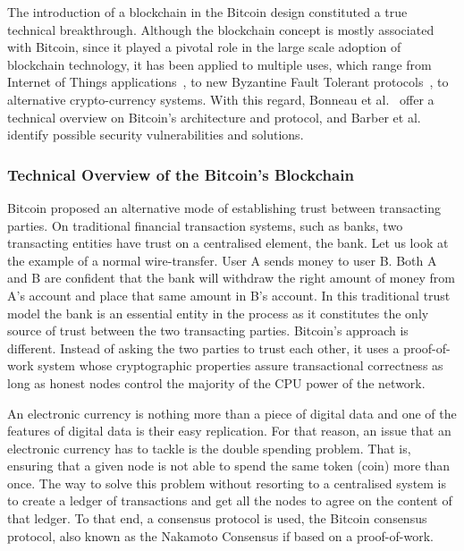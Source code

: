 \documentclass[letterpaper,twocolumn,10pt]{article}
\begin{document}
The introduction of a blockchain in the Bitcoin design constituted a true technical breakthrough. Although the blockchain concept is mostly associated with Bitcoin, since it played a pivotal role in the large scale adoption of blockchain technology, it has been applied to multiple uses, which range from Internet of Things applications~\cite{Christidis:2016bn}, to new Byzantine Fault Tolerant protocols~\cite{Miller:2016wo}, to alternative crypto-currency systems. With this regard, Bonneau et al.~\cite{Bonneau:2015ema} offer a technical overview on Bitcoin's architecture and protocol, and Barber et al.~\cite{Barber:2012va} identify possible security vulnerabilities and solutions.




\subsubsection{Technical Overview of the Bitcoin's Blockchain}
\label{sec:tech_bitcoin}

Bitcoin proposed an alternative mode of establishing trust between transacting parties. On traditional financial transaction systems, such as banks, two transacting entities have trust on a centralised element, the bank. Let us look at the example of a normal wire-transfer. User A sends money to user B. Both A and B are confident that the bank will withdraw the right amount of money from A's account and place that same amount in B's account. In this traditional trust model the bank is an essential entity in the process as it constitutes the only source of trust between the two transacting parties. Bitcoin's approach is different. Instead of asking the two parties to trust each other, it uses a proof-of-work system whose cryptographic properties assure transactional correctness as long as honest nodes control the majority of the CPU power of the network.

An electronic currency is nothing more than a piece of digital data and one of the features of digital data is their easy replication. For that reason, an issue that an electronic currency has to tackle is the double spending problem. That is, ensuring that a given node is not able to spend the same token (coin) more than once. The way to solve this problem without resorting to a centralised system is to create a ledger of transactions and get all the nodes to agree on the content of that ledger. To that end, a consensus protocol is used, the Bitcoin consensus protocol, also known as the Nakamoto Consensus if based on a proof-of-work.
\end{document}
